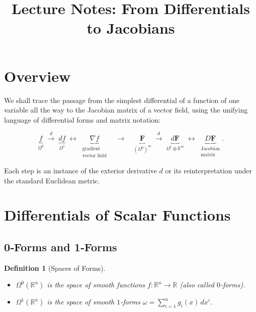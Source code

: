 \documentclass[12pt]{article}
\theoremstyle{definitionstyle}
\newtheorem{definition}{Definition} %
\newcommand{\R}{\mathbb{R}}
\begin{document}
	
	\title{Lecture Notes: From Differentials to Jacobians}
	\author{}
	\date{}
	\maketitle
	
	\section*{Overview}
	
	We shall trace the passage from the simplest differential of a function of one variable all the way to the Jacobian matrix of a vector field, using the unifying language of differential forms and matrix notation:
	
	\[
	\underbrace{f}_{\Omega^0}
	\;\xrightarrow{d}\;
	\underbrace{df}_{\Omega^1}
	\;\longleftrightarrow\;
	\underbrace{\nabla f}_{\substack{\text{gradient}\\\text{vector field}}}
	\quad
	\longrightarrow
	\quad
	\underbrace{\mathbf F}_{(\Omega^0)^m}
	\;\xrightarrow{d}\;
	\underbrace{d\mathbf F}_{\Omega^1\otimes\R^m}
	\;\longleftrightarrow\;
	\underbrace{D\mathbf F}_{\substack{\text{Jacobian}\\\text{matrix}}}.
	\]
	
	Each step is an instance of the exterior derivative \(d\) or its reinterpretation under the standard Euclidean metric.
	
	\bigskip
	
	\section{Differentials of Scalar Functions}
	
	\subsection{0‐Forms and 1‐Forms}
	
	\begin{definition}[Spaces of Forms]
		\begin{itemize}
			\item \(\Omega^0(\R^n)\) is the space of smooth functions \(f:\R^n\to\R\) (also called \(0\)-forms).
			\item \(\Omega^1(\R^n)\) is the space of smooth \(1\)-forms 
			\(\displaystyle \omega = \sum_{i=1}^n g_i(x)\,dx^i\).
		\end{itemize}
	\end{definition}
	
\end{document}
